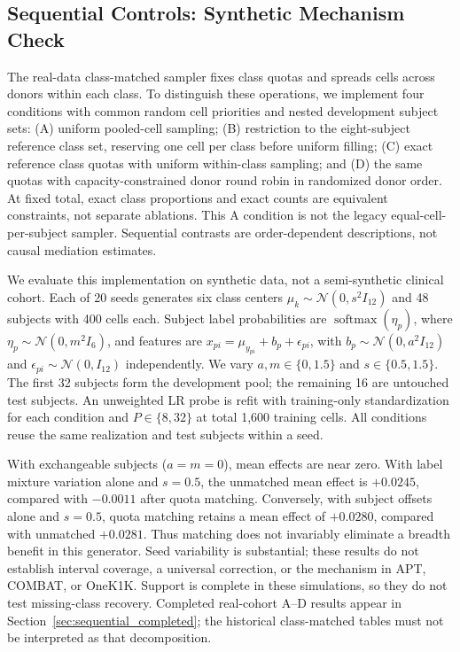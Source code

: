 \subsection{Sequential Controls: Synthetic Mechanism Check}
\label{sec:appendix:sequential_simulation}

The real-data class-matched sampler fixes class quotas and spreads cells across
donors within each class. To distinguish these operations, we implement four
conditions with common random cell priorities and nested development subject
sets: (A) uniform pooled-cell sampling; (B) restriction to the eight-subject
reference class set, reserving one cell per class before uniform filling;
(C) exact reference class quotas with uniform within-class sampling; and
(D) the same quotas with capacity-constrained donor round robin in randomized
donor order. At fixed total, exact class proportions and exact counts are
equivalent constraints, not separate ablations. This A condition is not the
legacy equal-cell-per-subject sampler. Sequential contrasts are order-dependent
descriptions, not causal mediation estimates.

We evaluate this implementation on synthetic data, not a semi-synthetic clinical
cohort. Each of 20 seeds generates six class centers $\mu_k\sim
\mathcal{N}(0,s^2I_{12})$ and 48 subjects with 400 cells each. Subject label
probabilities are $\operatorname{softmax}(\eta_p)$, where
$\eta_p\sim\mathcal{N}(0,m^2I_6)$, and features are
$x_{pi}=\mu_{y_{pi}}+b_p+\epsilon_{pi}$, with
$b_p\sim\mathcal{N}(0,a^2I_{12})$ and
$\epsilon_{pi}\sim\mathcal{N}(0,I_{12})$ independently. We vary
$a,m\in\{0,1.5\}$ and $s\in\{0.5,1.5\}$. The first 32 subjects form the
development pool; the remaining 16 are untouched test subjects. An unweighted
LR probe is refit with training-only standardization for each condition and
$P\in\{8,32\}$ at total 1,600 training cells. All conditions reuse the same
realization and test subjects within a seed.



With exchangeable subjects ($a=m=0$), mean effects are near zero. With label
mixture variation alone and $s=0.5$, the unmatched mean effect is $+0.0245$,
compared with $-0.0011$ after quota matching. Conversely, with subject offsets
alone and $s=0.5$, quota matching retains a mean effect of $+0.0280$, compared
with unmatched $+0.0281$. Thus matching does not invariably eliminate a breadth
benefit in this generator. Seed variability is substantial; these results do
not establish interval coverage, a universal correction, or the mechanism in
APT, COMBAT, or OneK1K. Support is complete in these simulations, so they do not
test missing-class recovery. Completed real-cohort A--D results appear in
Section~\ref{sec:sequential_completed}; the historical class-matched tables
must not be interpreted as that decomposition.

